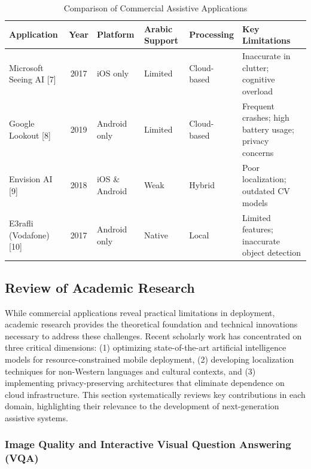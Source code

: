\documentclass[a4paper]{report}
\begin{document}
\begin{table}[H]
\centering
\caption{Comparison of Commercial Assistive Applications}
\label{tab:commercial-comparison}
\small
\begin{tabular}{@{}R{2.8cm}cR{2.2cm}R{2.2cm}R{2cm}R{3.5cm}@{}}
\toprule
\textbf{Application} & \textbf{Year} & \textbf{Platform} & \textbf{Arabic Support} & \textbf{Processing} & \textbf{Key Limitations} \\
\midrule
Microsoft Seeing AI [7] & 2017 & iOS only & Limited & Cloud-based & Inaccurate in clutter; cognitive overload \\
\midrule
Google Lookout [8] & 2019 & Android only & Limited & Cloud-based & Frequent crashes; high battery usage; privacy concerns \\
\midrule
Envision AI [9] & 2018 & iOS \& Android & Weak & Hybrid & Poor localization; outdated CV models \\
\midrule
E3rafli (Vodafone) [10] & 2017 & Android only & Native & Local & Limited features; inaccurate object detection \\
\bottomrule
\end{tabular}
\end{table}

\subsection{Review of Academic Research}

While commercial applications reveal practical limitations in deployment, academic research provides the theoretical foundation and technical innovations necessary to address these challenges. Recent scholarly work has concentrated on three critical dimensions: (1) optimizing state-of-the-art artificial intelligence models for resource-constrained mobile deployment, (2) developing localization techniques for non-Western languages and cultural contexts, and (3) implementing privacy-preserving architectures that eliminate dependence on cloud infrastructure. This section systematically reviews key contributions in each domain, highlighting their relevance to the development of next-generation assistive systems.

\subsubsection{Image Quality and Interactive Visual Question Answering (VQA)}
\end{document}
